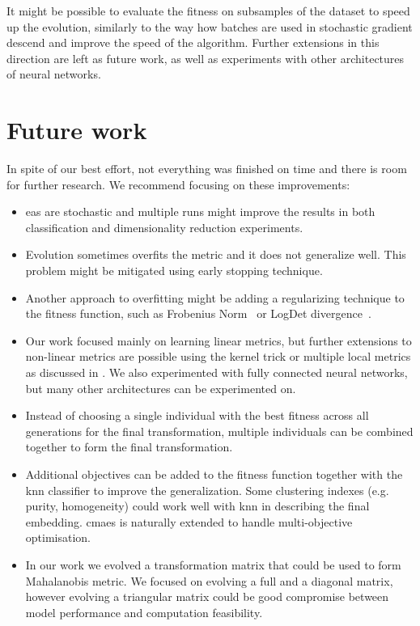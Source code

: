 \documentclass[12pt,a4paper]{report}
\begin{document}
It might be possible to evaluate the fitness on subsamples of the dataset to speed up the evolution, similarly to the way how batches are used in stochastic gradient descend and improve the speed of the algorithm. Further extensions in this direction are left as future work, as well as experiments with other architectures of neural networks.

\chapter*{Future work}


In spite of our best effort, not everything was finished on time and there is room for further research. We recommend focusing on these improvements:

\begin{itemize}
\item \Aclp{ea} are stochastic and multiple runs might improve the results in both classification and dimensionality reduction experiments.
\item Evolution sometimes overfits the metric and it does not generalize well. This problem might be mitigated using early stopping technique.

\item Another approach to overfitting might be adding a regularizing technique to the fitness function, such as Frobenius Norm~\citep{schultz2003learning} or LogDet divergence~\citep{davis2007information}.

\item Our work focused mainly on learning linear metrics, but further extensions to non-linear metrics are possible using the kernel trick \citep{chatpatanasiri2010new} or multiple local metrics as discussed in \cite{bellet2013survey}. We also experimented with fully connected neural networks, but many other architectures can be experimented on.

\item Instead of choosing a single individual with the best fitness across all generations for the final transformation, multiple individuals can be combined together to form the final transformation.

\item Additional objectives can be added to the fitness function together with the \ac{knn} classifier to improve the generalization.  Some clustering indexes (e.g. purity, homogeneity) could work well with \ac{knn} in describing the final embedding. \ac{cmaes} is naturally extended to handle multi-objective optimisation.

\item In our work we evolved a transformation matrix that could be used to form Mahalanobis metric. We focused on evolving a full and a diagonal matrix, however evolving a triangular matrix could be good compromise between model performance and computation feasibility.
\end{itemize}
\end{document}
